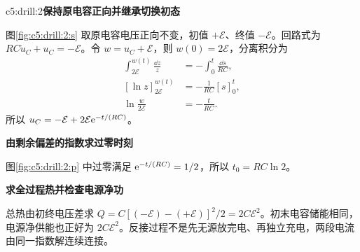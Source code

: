 \begin{drillsolution}{c5:drill:2}\textbf{保持原电容正向并继承切换初态}\par\nobreak
图\ref{fig:c5:drill:2:s} 取原电容电压正向不变，初值 $+\mathcal E$、终值 $-\mathcal E$。回路式为 $RC\dot u_C+u_C=-\mathcal E$。令 $w=u_C+\mathcal E$，则 $w(0)=2\mathcal E$，分离积分为
\[
\begin{aligned}
\int_{2\mathcal E}^{w(t)}\frac{\dd z}{z}&=-\int_0^t\frac{\dd s}{RC},\\
[\ln z]_{2\mathcal E}^{w(t)}&=-\frac1{RC}[s]_0^t,\\
\ln\frac{w}{2\mathcal E}&=-\frac t{RC}.
\end{aligned}
\]
所以 $u_C=-\mathcal E+2\mathcal E\mathrm e^{-t/(RC)}$。



\par\medskip{}\noindent\textbf{由剩余偏差的指数求过零时刻}\par\nobreak
图\ref{fig:c5:drill:2:p} 中过零满足 $\mathrm e^{-t/(RC)}=1/2$，所以 $t_0=RC\ln2$。

\par\medskip{}\noindent\textbf{求全过程热并检查电源净功}\par\nobreak
总热由初终电压差求 $Q=C[(-\mathcal E)-(+\mathcal E)]^2/2=2C\mathcal E^2$。初末电容储能相同，电源净供能也正好为 $2C\mathcal E^2$。反接过程不是先无源放完电、再独立充电，两段电流由同一指数解连续连接。\end{drillsolution}
